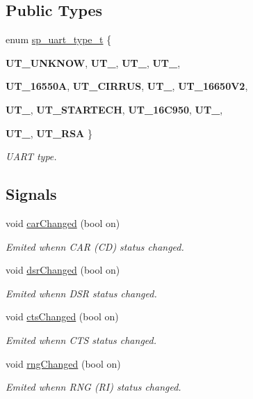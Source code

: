 \subsection*{Public Types}
\begin{DoxyCompactItemize}
\item 
enum \hyperlink{classmdt_abstract_serial_port_a56b107c57fb0acb17cfcca262abe6a54}{sp\_\-uart\_\-type\_\-t} \{ \par
{\bfseries UT\_\-UNKNOW}, 
{\bfseries UT\_}, 
{\bfseries UT\_}, 
{\bfseries UT\_}, 
\par
{\bfseries UT\_\-16550A}, 
{\bfseries UT\_\-CIRRUS}, 
{\bfseries UT\_}, 
{\bfseries UT\_\-16650V2}, 
\par
{\bfseries UT\_}, 
{\bfseries UT\_\-STARTECH}, 
{\bfseries UT\_\-16C950}, 
{\bfseries UT\_}, 
\par
{\bfseries UT\_}, 
{\bfseries UT\_\-RSA}
 \}
\begin{DoxyCompactList}\small\item\em UART type. \end{DoxyCompactList}\end{DoxyCompactItemize}
\subsection*{Signals}
\begin{DoxyCompactItemize}
\item 
void \hyperlink{classmdt_abstract_serial_port_a63ddcadf5d8a63c479b0b6a24f89c837}{carChanged} (bool on)
\begin{DoxyCompactList}\small\item\em Emited whenn CAR (CD) status changed. \end{DoxyCompactList}\item 
void \hyperlink{classmdt_abstract_serial_port_a077d8c39ed12713742f1f2ffa0dca11d}{dsrChanged} (bool on)
\begin{DoxyCompactList}\small\item\em Emited whenn DSR status changed. \end{DoxyCompactList}\item 
void \hyperlink{classmdt_abstract_serial_port_adf45a5006218ef5660721ecdf8454b5d}{ctsChanged} (bool on)
\begin{DoxyCompactList}\small\item\em Emited whenn CTS status changed. \end{DoxyCompactList}\item 
void \hyperlink{classmdt_abstract_serial_port_a47c08ccb99dc6de76ae58ebeefc26857}{rngChanged} (bool on)
\begin{DoxyCompactList}\small\item\em Emited whenn RNG (RI) status changed. \end{DoxyCompactList}\end{DoxyCompactItemize}
